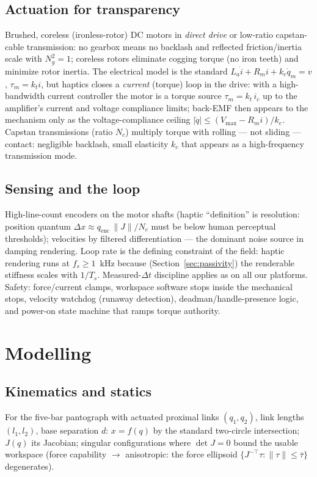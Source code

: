 \documentclass[conference]{IEEEtran}
\begin{document}
\subsection{Actuation for transparency}
Brushed, coreless (ironless-rotor) DC motors in \emph{direct drive} or low-ratio capstan-cable transmission: no gearbox means no backlash and reflected friction/inertia scale with $N_g^2 = 1$; coreless rotors eliminate cogging torque (no iron teeth) and minimize rotor inertia. The electrical model is the standard $L_a\dot i + R_m i + k_e\dot q_m = v$, $\tau_m = k_t i$, but haptics closes a \emph{current} (torque) loop in the drive: with a high-bandwidth current controller the motor is a torque source $\tau_m = k_t\,i_c$ up to the amplifier's current and voltage compliance limits; back-EMF then appears to the mechanism only as the voltage-compliance ceiling $|\dot q|\le (V_{\max} - R_m i)/k_e$. Capstan transmissions (ratio $N_c$) multiply torque with rolling --- not sliding --- contact: negligible backlash, small elasticity $k_c$ that appears as a high-frequency transmission mode.

\subsection{Sensing and the loop}
High-line-count encoders on the motor shafts (haptic ``definition'' is resolution: position quantum $\Delta x \approx q_{\mathrm{enc}}\,\|J\|/N_c$ must be below human perceptual thresholds); velocities by filtered differentiation --- the dominant noise source in damping rendering. Loop rate is the defining constraint of the field: haptic rendering runs at $f_s \ge 1$~kHz because (Section~\ref{sec:passivity}) the renderable stiffness scales with $1/T_s$. Measured-$\Delta t$ discipline applies as on all our platforms. Safety: force/current clamps, workspace software stops inside the mechanical stops, velocity watchdog (runaway detection), deadman/handle-presence logic, and power-on state machine that ramps torque authority.

\section{Modelling}
\subsection{Kinematics and statics}
For the five-bar pantograph with actuated proximal links $(q_1, q_2)$, link lengths $(l_1, l_2)$, base separation $d$: $x = f(q)$ by the standard two-circle intersection; $J(q)$ its Jacobian; singular configurations where $\det J = 0$ bound the usable workspace (force capability $\to$ anisotropic: the force ellipsoid $\{J^{-\!\top}\tau : \|\tau\|\le\bar\tau\}$ degenerates).
\end{document}
